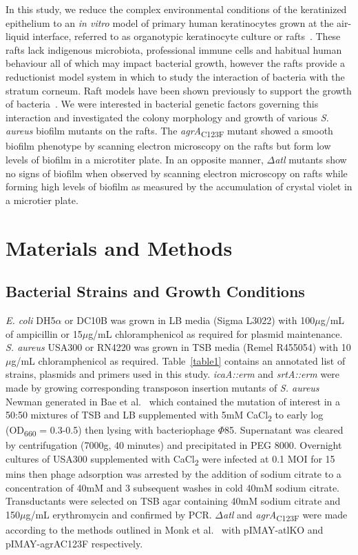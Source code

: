 \documentclass[10pt,letterpaper]{article}
\begin{document}
In this study, we reduce the complex environmental conditions of the keratinized epithelium to an \textit{in vitro} model of primary human keratinocytes grown at the air-liquid interface, referred to as organotypic keratinocyte culture or rafts~\cite{simpson_rna_2010}.
These rafts lack indigenous microbiota, professional immune cells and habitual human behaviour all of which may impact bacterial growth, however the rafts provide a reductionist model system in which to study the interaction of bacteria with the stratum corneum.
Raft models have been shown previously to support the growth of bacteria~\cite{breij_three-dimensional_2012, holland_microbial_2008, reijer_detection_2016}.
We were interested in bacterial genetic factors governing this interaction and investigated the colony morphology and growth of various \textit{S. aureus} biofilm mutants on the rafts.
The \textit{agrA}\textsubscript{C123F} mutant showed a smooth biofilm phenotype by scanning electron microscopy on the rafts but form low levels of biofilm in a microtiter plate.
In an opposite manner, $\Delta$\textit{atl} mutants show no signs of biofilm when observed by scanning electron microscopy on rafts while forming high levels of biofilm as measured by the accumulation of crystal violet in a microtier plate.

\section*{Materials and Methods}

\subsection*{Bacterial Strains and Growth Conditions}
\textit{E. coli} DH5$\alpha$ or DC10B was grown in LB media (Sigma L3022) with 100$\mu$g/mL of ampicillin or 15$\mu$g/mL chloramphenicol as required for plasmid maintenance.
\textit{S. aureus} USA300 or RN4220 was grown in TSB media (Remel R455054) with 10$\mu$g/mL chloramphenicol as required.
Table~\ref{table1} contains an annotated list of strains, plasmids and primers used in this study.
\textit{icaA::erm} and \textit{srtA::erm} were made by growing corresponding transposon insertion mutants of \textit{S. aureus} Newman generated in Bae et al.~\cite{bae_staphylococcus_2004} which contained the mutation of interest in a 50:50 mixtures of TSB and LB supplemented with 5mM CaCl\textsubscript{2} to early log (OD\textsubscript{660} = 0.3-0.5) then lysing with bacteriophage $\Phi$85.
Supernatant was cleared by centrifugation (7000g, 40 minutes) and precipitated in PEG 8000.
Overnight cultures of USA300 supplemented with CaCl\textsubscript{2} were infected at 0.1 MOI for 15 mins then phage adsorption was arrested by the addition of sodium citrate to a concentration of 40mM and 3 subsequent washes in cold 40mM sodium citrate.
Transductants were selected on TSB agar containing 40mM sodium citrate and 150$\mu$g/mL erythromycin and confirmed by PCR.
$\Delta$\textit{atl} and \textit{agrA}\textsubscript{C123F} were made according to the methods outlined in Monk et al.~\cite{monk_transforming_2012} with pIMAY-atlKO and pIMAY-agrAC123F respectively.
\end{document}
